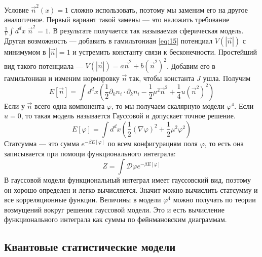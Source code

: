 \documentclass[a4paper,12pt]{article} \usepackage[utf8x]{inputenc} \usepackage[russian]{babel}
\theoremstyle{definition} \newtheorem{corollary}{Corollary}[theorem] \theoremstyle{definition}
\begin{document}
Условие $\vec n^2(x)=1$ сложно использовать, поэтому мы заменим его на другое аналогичное. Первый
вариант такой замены --- это наложить требование $\frac{1}{V}\int d^dx\; \vec n^2=1$. В результате
получается так называемая сферическая модель. Другая возможность --- добавить в гамильтониан
\eqref{eq:15} потенциал $V(\left|\vec n\right|)$ с минимумом в $\left|\vec n\right|=1$ и устремить
константу связи к бесконечности. Простейший вид такого потенциала --- $V(\left|\vec n\right|)=a\vec
n^2+b\left(\vec n^2\right)^2$. Добавим его в гамильтониан и изменим нормировку $\vec n$ так, чтобы
константа $J$ ушла. Получим
\begin{equation}
  \label{eq:16} E[\vec n]=\int d^d x \left(\frac{1}{2}\partial_k n_i\cdot \partial_k
n_i-\frac{1}{2}\mu^2 \vec n^2+\frac{1}{4}u\left(\vec n^2\right)^2\right)
\end{equation} Если у $\vec n$ всего одна компонента $\varphi$, то мы получаем скалярную модели
$\varphi^4$. Если $u=0$, то такая модель называется Гауссовой и допускает точное решение.
\begin{equation}
  \label{eq:17} E[\varphi]=\int d^d x (\frac{1}{2}(\nabla \varphi)^2+\frac{1}{2}\mu^2 \varphi^2)
\end{equation} Статсумма --- это сумма $e^{-\beta E[\varphi]}$ по всем конфигурациям поля $\varphi$,
то есть она записывается при помощи функционального интеграла:
\begin{equation}
  \label{eq:18} Z=\int \mathcal{D}\varphi e^{-\beta E[\varphi]}
\end{equation} В гауссовой модели функциональный интеграл имеет гауссовский вид, поэтому он хорошо
определен и легко вычисляется. Значит можно вычислить статсумму и все корреляционные функции.
Величины в модели $\varphi^4$ можно получать по теории возмущений вокруг решения гауссовой модели.
Это и есть вычисление функционального интеграла как суммы по фейнмановским диаграммам.

\subsection*{Квантовые статистические модели}
\label{sec:quantum-statistical-models}
\end{document}

